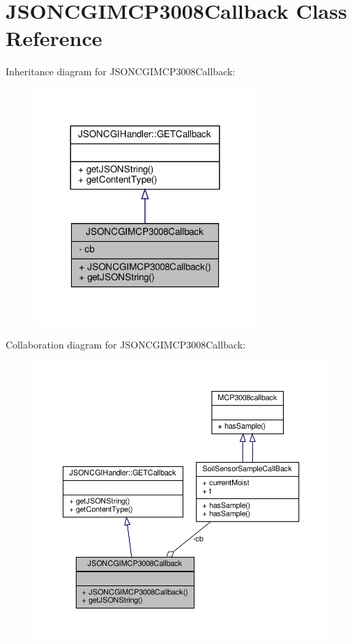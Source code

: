 \hypertarget{classJSONCGIMCP3008Callback}{}\section{J\+S\+O\+N\+C\+G\+I\+M\+C\+P3008\+Callback Class Reference}
\label{classJSONCGIMCP3008Callback}


Inheritance diagram for J\+S\+O\+N\+C\+G\+I\+M\+C\+P3008\+Callback\+:
\nopagebreak
\begin{figure}[H]
\begin{center}
\leavevmode
\includegraphics[width=240pt]{classJSONCGIMCP3008Callback__inherit__graph}
\end{center}
\end{figure}


Collaboration diagram for J\+S\+O\+N\+C\+G\+I\+M\+C\+P3008\+Callback\+:
\nopagebreak
\begin{figure}[H]
\begin{center}
\leavevmode
\includegraphics[width=350pt]{classJSONCGIMCP3008Callback__coll__graph}
\end{center}
\end{figure}

